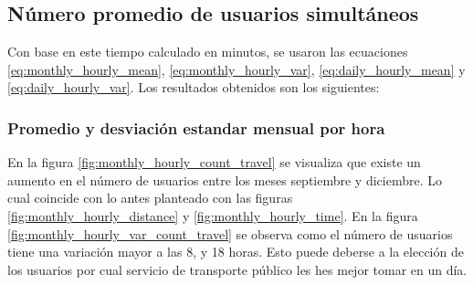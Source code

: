 \subsection{Número promedio de usuarios simultáneos}

Con base en este tiempo calculado en minutos, se usaron las ecuaciones \ref{eq:monthly_hourly_mean}, \ref{eq:monthly_hourly_var}, \ref{eq:daily_hourly_mean} y \ref{eq:daily_hourly_var}. Los resultados obtenidos son los siguientes:

\subsubsection{Promedio y desviación estandar mensual por hora}

En la figura \ref{fig:monthly_hourly_count_travel} se visualiza que existe un aumento en el número de usuarios entre los meses septiembre y diciembre. Lo cual coincide con lo antes planteado con las figuras \ref{fig:monthly_hourly_distance} y \ref{fig:monthly_hourly_time}. En la figura \ref{fig:monthly_hourly_var_count_travel} se observa como el número de usuarios tiene una variación mayor a las 8, y 18 horas. Esto puede deberse a la elección de los usuarios por cual servicio de transporte público les hes mejor tomar en un día.

